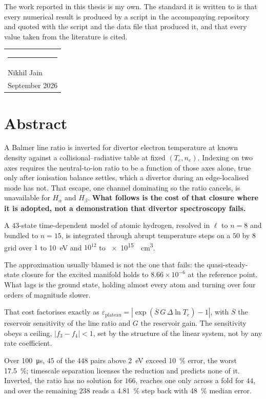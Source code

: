 \documentclass[12pt,a4paper,oneside]{report}
\newcommand{\nel}{n_e}
\newcommand{\Te}{T_e}
\newcommand{\epsplat}{\varepsilon_{\mathrm{plateau}}}
\begin{document}
The work reported in this thesis is my own. The standard it is written to is
that every numerical result is produced by a script in the accompanying
repository and quoted with the script and the data file that produced it, and
that every value taken from the literature is cited.

\vspace{3cm}
\noindent
\begin{tabular}{@{}l@{}}
  \rule{6cm}{0.4pt}\\
  Nikhil Jain\\
  September 2026
\end{tabular}

\chapter*{Abstract}

A Balmer line ratio is inverted for divertor electron temperature at known
density against a collisional--radiative table at fixed $(\Te,\nel)$. Indexing
on two axes requires the neutral-to-ion ratio to be a function of those axes
alone, true only after ionisation balance settles, which a divertor during an
edge-localised mode has not. That escape, one channel dominating so the ratio
cancels, is unavailable for $H_\alpha$ and $H_\beta$. \textbf{What follows is
the cost of that closure where it is adopted, not a demonstration that divertor
spectroscopy fails.}

A $43$-state time-dependent model of atomic hydrogen, resolved in $\ell$ to
$n=8$ and bundled to $n=15$, is integrated through abrupt temperature steps on
a $50$ by $8$ grid over $1$ to \SI{10}{\electronvolt} and $10^{12}$ to
\SI{e15}{\per\cubic\centi\metre}.

The approximation usually blamed is not the one that fails: the
quasi-steady-state closure for the excited manifold holds to
$8.66\times10^{-6}$ at the reference point. What lags is the ground state,
holding almost every atom and turning over four orders of magnitude slower.

That cost factorises exactly as
$\epsplat = |\exp(\overline{S}\,G\,\Delta\ln\Te)-1|$, with $\overline{S}$ the
reservoir sensitivity of the line ratio and $G$ the reservoir gain. The
sensitivity obeys a ceiling, $|f_3-f_4| < 1$, set by the structure of the
linear system, not by any rate coefficient.

Over \SI{100}{\micro\second}, $45$ of the $448$ pairs above
\SI{2}{\electronvolt} exceed \SI{10}{\percent} error, the worst
\SI{17.5}{\percent}; timescale separation licenses the reduction and predicts
none of it. Inverted, the
ratio has no solution for $166$, reaches one only across a fold for $44$, and
over the remaining $238$ reads a \SI{4.81}{\percent} step back with
\SI{48}{\percent} median error.
\end{document}
